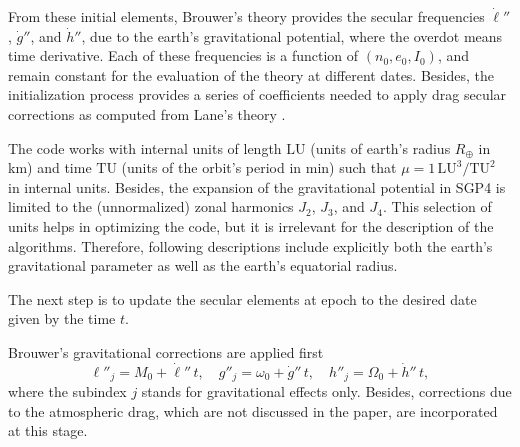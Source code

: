 \documentclass{article}
\begin{document}
From these initial elements, Brouwer's theory provides the secular frequencies $\dot\ell''$, $\dot{g}''$, and $\dot{h}''$, due to the earth's gravitational potential, where the overdot means time derivative. Each of these frequencies is a function of $(n_0,e_0,I_0)$, and remain constant for the evaluation of the theory at different dates. Besides, the initialization process provides a series of coefficients needed to apply drag secular corrections as computed from Lane's theory \cite{Lane1965}.
\par

The code works with internal units of length $\mathrm{LU}$ (units of earth's radius $R_\oplus$ in km) and time $\mathrm{TU}$ (units of the orbit's period in min) such that $\mu=1\,\mathrm{LU^3/TU^2}$ in internal units. Besides, the expansion of the gravitational potential in SGP4 is limited to the (unnormalized) zonal harmonics $J_2$, $J_3$, and $J_4$. This selection of units helps in optimizing the code, but it is irrelevant for the description of the algorithms. Therefore, following descriptions include explicitly both the earth's gravitational parameter as well as the earth's equatorial radius.

The next step is to update the secular elements at epoch to the desired date given by the time $t$.

Brouwer's gravitational corrections are applied first
\[
\ell''_j=M_0+\dot\ell''\,t, \quad g''_j=\omega_0+\dot{g}''\,t, \quad h''_j=\Omega_0+\dot{h}''\,t, %
\]
where the subindex $j$ stands for gravitational effects only. Besides, corrections due to the atmospheric drag, which are not discussed in the paper, are incorporated at this stage.
\end{document}
